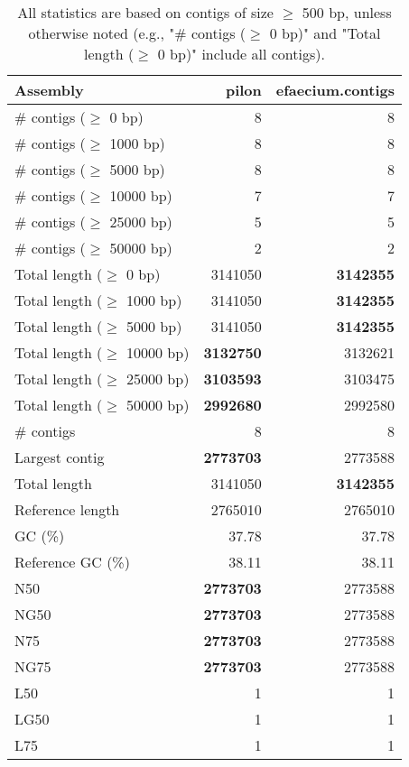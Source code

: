 \documentclass[12pt,a4paper]{article}
\begin{document}
\begin{table}[ht]
\begin{center}
\caption{All statistics are based on contigs of size $\geq$ 500 bp, unless otherwise noted (e.g., "\# contigs ($\geq$ 0 bp)" and "Total length ($\geq$ 0 bp)" include all contigs).}
\begin{tabular}{|l*{2}{|r}|}
\hline
Assembly & pilon & efaecium.contigs \\ \hline
\# contigs ($\geq$ 0 bp) & 8 & 8 \\ \hline
\# contigs ($\geq$ 1000 bp) & 8 & 8 \\ \hline
\# contigs ($\geq$ 5000 bp) & 8 & 8 \\ \hline
\# contigs ($\geq$ 10000 bp) & 7 & 7 \\ \hline
\# contigs ($\geq$ 25000 bp) & 5 & 5 \\ \hline
\# contigs ($\geq$ 50000 bp) & 2 & 2 \\ \hline
Total length ($\geq$ 0 bp) & 3141050 & {\bf 3142355} \\ \hline
Total length ($\geq$ 1000 bp) & 3141050 & {\bf 3142355} \\ \hline
Total length ($\geq$ 5000 bp) & 3141050 & {\bf 3142355} \\ \hline
Total length ($\geq$ 10000 bp) & {\bf 3132750} & 3132621 \\ \hline
Total length ($\geq$ 25000 bp) & {\bf 3103593} & 3103475 \\ \hline
Total length ($\geq$ 50000 bp) & {\bf 2992680} & 2992580 \\ \hline
\# contigs & 8 & 8 \\ \hline
Largest contig & {\bf 2773703} & 2773588 \\ \hline
Total length & 3141050 & {\bf 3142355} \\ \hline
Reference length & 2765010 & 2765010 \\ \hline
GC (\%) & 37.78 & 37.78 \\ \hline
Reference GC (\%) & 38.11 & 38.11 \\ \hline
N50 & {\bf 2773703} & 2773588 \\ \hline
NG50 & {\bf 2773703} & 2773588 \\ \hline
N75 & {\bf 2773703} & 2773588 \\ \hline
NG75 & {\bf 2773703} & 2773588 \\ \hline
L50 & 1 & 1 \\ \hline
LG50 & 1 & 1 \\ \hline
L75 & 1 & 1 \\ \hline

\end{tabular}
\end{center}
\end{table}
\end{document}
